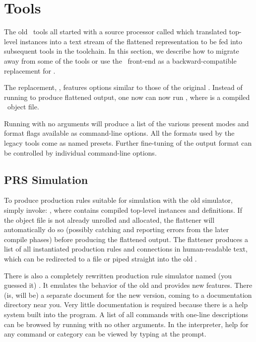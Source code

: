 
\section{Tools}
\label{sec:tools}

The old \CAST\ tools all started with a source processor called
 which translated top-level instances into a text stream of the 
flattened representation to be fed into subsequent tools in the toolchain.  
In this section, we describe how to migrate away from some of the tools or 
use the \hac\ front-end as a backward-compatible replacement for .  

The replacement, , features options
similar to those of the original .  
Instead of running 
to produce flattened output, one now can now run
, where  is a 
compiled \hac\ object file.  

Running  with no arguments will produce a list of the various
present modes and format flags available as command-line options.  
All the formats used by the legacy tools come as named presets.  
Further fine-tuning of the output format can be controlled by individual
 command-line options.  

\subsection{PRS Simulation}
\label{sec:tools:prsim}

To produce production rules suitable for simulation with the old 
 simulator, simply invoke:
, where  contains compiled
top-level instances and definitions.  
If the object file is not already unrolled and allocated, 
the flattener will automatically do so (possibly catching and 
reporting errors from the later compile phases) before producing
the flattened output.  
The flattener produces a list of all instantiated production rules
and connections in human-readable text, which can be redirected to a file
or piped straight into the old .  

There is also a completely rewritten production rule simulator named
(you guessed it) .  
It emulates the behavior of the old  and provides new features.
There (is, will be) a separate document for the new version, 
coming to a documentation directory near you.  
Very little documentation is required because there is a help system
built into the program.  
A list of all commands with one-line descriptions can be browsed
by running  with no other arguments.  
In the interpreter, help for any command or category can be viewed
by typing  at the prompt.  


